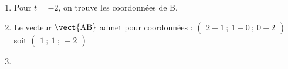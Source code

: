 \begin{enumerate}
\item 

Pour $t = - 2$, on trouve les coordonnées de B.
\item 
Le vecteur $\vect{\text{AB}}$ admet pour coordonnées : $\begin{pmatrix}2 - 1~;~1 - 0~;~0 - 2\end{pmatrix}$ soit $\begin{pmatrix}1~;~1~;~- 2\end{pmatrix}$


\item %


\end{enumerate}

